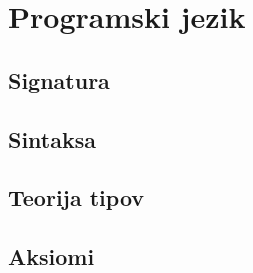 \section{Programski jezik}

\subsection{Signatura}

\subsection{Sintaksa}

\subsection{Teorija tipov}

\subsection{Aksiomi}






